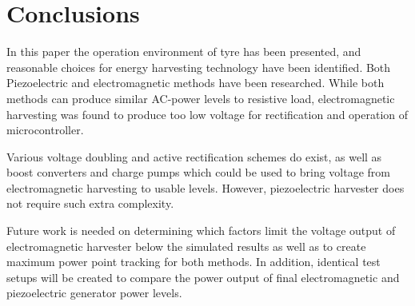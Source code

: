 \section{Conclusions}
In this paper the operation environment of tyre has been presented, and reasonable choices for energy harvesting technology have been identified. Both Piezoelectric and electromagnetic methods have been researched. While both methods can produce similar AC-power levels to resistive load, electromagnetic harvesting was found to produce too low voltage for rectification and operation of microcontroller.

Various voltage doubling and active rectification schemes do exist, as well as boost converters and charge pumps which could be used to bring voltage from electromagnetic harvesting to usable levels. However, piezoelectric harvester does not require such extra complexity. 

Future work is needed on determining which factors limit the voltage output of electromagnetic harvester below the simulated results as well as to create maximum power point tracking for both methods. In addition, identical test setups will be created to compare the power output of final electromagnetic and piezoelectric generator power levels. 
